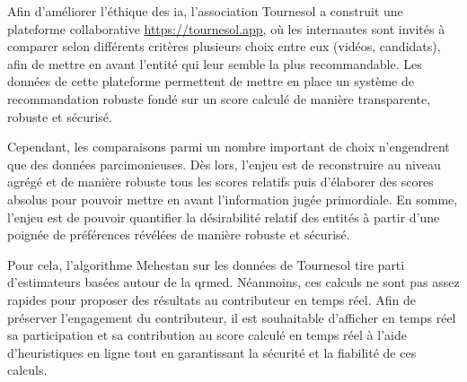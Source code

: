 Afin d'améliorer l'éthique des \gls{ia}, l'association Tournesol a construit une plateforme collaborative \href{https://tournesol.app}{https://tournesol.app}, où les internautes sont invités à comparer selon différents critères plusieurs choix entre eux (vidéos, candidats), afin de mettre en avant l'entité qui leur semble la plus recommandable. Les données de cette plateforme permettent de mettre en place un système de recommandation robuste fondé sur un score calculé de manière transparente, robuste et sécurisé.

Cependant, les comparaisons parmi un nombre important de choix n'engendrent que des données parcimonieuses. Dès lors, l'enjeu est de reconstruire au niveau agrégé et de manière robuste tous les scores relatifs puis d'élaborer des scores absolus pour pouvoir mettre en avant l'information jugée primordiale. En somme, l'enjeu est de pouvoir quantifier la désirabilité relatif des entités à partir d'une poignée de préférences révélées de manière robuste et sécurisé.

Pour cela, l'algorithme Mehestan sur les données de Tournesol tire parti d'estimateurs basées autour de la \gls{qrmed}. Néanmoins, ces calculs ne sont pas assez rapides pour proposer des résultats au contributeur en temps réel. Afin de préserver l'engagement du contributeur, il est souhaitable d'afficher en temps réel sa participation et sa contribution au score calculé en temps réel à l'aide d'heuristiques en ligne tout en garantissant la sécurité et la fiabilité de ces calculs.

\pagebreak